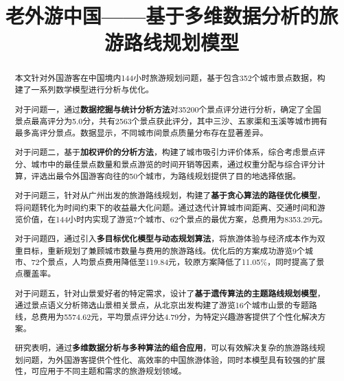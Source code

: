 \documentclass[withoutpreface,bwprint]{cumcmthesis} %
\begin{document}

\title{老外游中国——基于多维数据分析的旅游路线规划模型}
\maketitle

\begin{abstract}
本文针对外国游客在中国境内144小时旅游规划问题，基于包含352个城市景点数据，构建了一系列数学模型进行分析与优化。

对于问题一，通过\textbf{数据挖掘与统计分析方法}对35200个景点评分进行分析，确定了全国景点最高评分为5.0分，共有2563个景点获此评分，其中三沙、五家渠和玉溪等城市拥有最多高评分景点。数据显示，不同城市间景点质量分布存在显著差异。

对于问题二，基于\textbf{加权评价的分析方法}，构建了城市吸引力评价体系，综合考虑景点评分、城市中的最佳景点数量和景点游览的时间开销等因素，通过权重分配与综合评分计算，评选出最令外国游客向往的50个城市，为路线规划提供了目的地选择依据。

对于问题三，针对从广州出发的旅游路线规划，构建了\textbf{基于贪心算法的路径优化模型}，将问题转化为时间约束下的收益最大化问题。通过迭代计算城市间距离、交通时间和游览价值，在144小时内实现了游览7个城市、62个景点的最优方案，总费用为8353.29元。

对于问题四，通过引入\textbf{多目标优化模型与动态规划算法}，将旅游体验与经济成本作为双重目标，重新规划了兼顾城市数量与费用的旅游路线。优化后的方案成功游览9个城市、72个景点，人均景点费用降低至119.84元，较原方案降低了11.05\%，同时提高了景点覆盖率。

对于问题五，针对山景爱好者的特定需求，设计了\textbf{基于遗传算法的主题路线规划模型}，通过景点语义分析筛选山景相关景点，从北京出发构建了游览16个城市山景的专题路线，总费用为5574.62元，平均景点评分达4.79分，为特定兴趣游客提供了个性化解决方案。

研究表明，通过\textbf{多维数据分析与多种算法的组合应用}，可以有效解决复杂的旅游路线规划问题，为外国游客提供个性化、高效率的中国旅游体验，同时本模型具有较强的扩展性，可应用于不同主题和需求的旅游规划领域。


\end{abstract}
\end{document}
